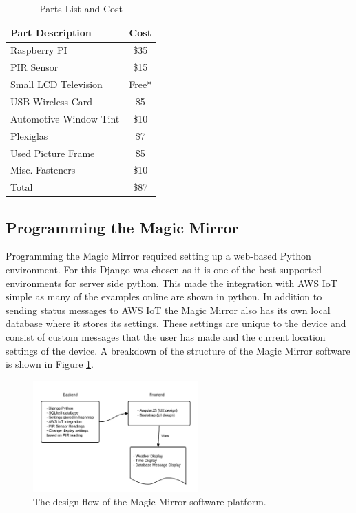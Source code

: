 \documentclass[conference]{IEEEtran}
\begin{document}
\begin{table}[!t]
\renewcommand{\arraystretch}{1.3}
\caption{Parts List and Cost}
\label{tab:cost}
\centering
\begin{tabular}{|l|c|}
\hline
Part Description & Cost\\
\hline
\hline
Raspberry PI & \$35\\
\hline
PIR Sensor & \$15\\
\hline
Small LCD Television & Free*\\
\hline
USB Wireless Card & \$5\\
\hline
Automotive Window Tint & \$10\\
\hline
Plexiglas & \$7\\
\hline
Used Picture Frame & \$5\\
\hline
Misc. Fasteners & \$10\\
\hline
\hline
Total & \$87\\
\hline
\end{tabular}
\end{table}

\subsection{Programming the Magic Mirror}
Programming the Magic Mirror required setting up a web-based Python environment.
For this Django was chosen as it is one of the best supported environments for server side python.
This made the integration with AWS IoT simple as many of the examples online are shown in python.
In addition to sending status messages to AWS IoT the Magic Mirror also has its own local database where it stores its settings.
These settings are unique to the device and consist of custom messages that the user has made and the current location settings of the device.
A breakdown of the structure of the Magic Mirror software is shown in Figure \ref{fig:design}.

\begin{figure}[!ht]
  \centering
  \includegraphics[width=2.5in]{images/DesignFlow.png}
  \caption{The design flow of the Magic Mirror software platform.}
  \label{fig:design}
\end{figure}
\end{document}
